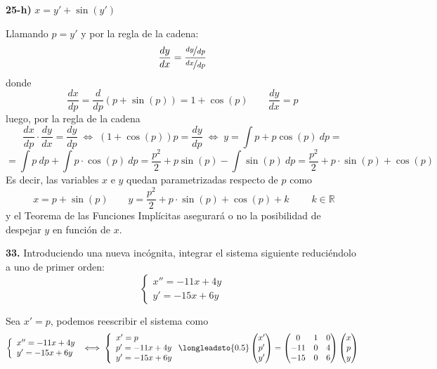 \begin{enumerate}
\textbf{25-h)} $x=y'+\sin(y')$
\begin{sol}
    Llamando $p=y'$ y por la regla de la cadena:
    $$\dfrac{dy}{dx}=\dfrac{\nicefrac{dy}{dp}}{\nicefrac{dx}{dp}}$$
    donde 
    $$\dfrac{dx}{dp}=\dfrac{d}{dp} (p + \sin (p))=1+\cos(p) \qquad \dfrac{dy}{dx}=p$$
    luego, por la regla de la cadena
    $$ \dfrac{dx}{dp} \cdot \dfrac{dy}{dx}=\dfrac{dy}{dp} \; \iff \; (1+\cos(p)) p = \dfrac{dy}{dp} \; \iff \; y=\int p + p \cos(p) \: dp=$$
    $$=\int p \:  dp + \int p \cdot \cos (p) \: dp = \dfrac{p^2}{2}+ p \sin (p) - \int \sin (p) \: dp=\dfrac{p^2}{2}+ p \cdot \sin (p) + \cos(p)$$
    Es decir, las variables $x$ e $y$ quedan parametrizadas respecto de $p$ como
    $$\boxed{ \; x=p+\sin(p) \qquad y=\dfrac{p^2}{2}+ p \cdot \sin (p) + \cos(p) + k \;} \qquad k \in \mathbb R$$
    y el Teorema de las Funciones Implícitas asegurará o no la posibilidad de despejar $y$ en función de $x$.
\end{sol}
\textbf{33.}  Introduciendo una nueva incógnita, integrar el sistema siguiente reduciéndolo a
uno de primer orden:
$$\left\{\begin{array}{l} x''=-11x+4y \\ y'=-15x+6y\end{array}\right.$$
\begin{sol}
    Sea $x'=p$, podemos reescribir el sistema como
    $$\left\{ \begin{array}{l}
         x'' = -11x + 4y  \\
         y' = -15x + 6y
    \end{array}\right. \iff \left\{ \begin{array}{l}
         x' = p \\
         p' = -11x+4y\\
         y' = -15x + 6y
    \end{array}\right. \longleadsto{0.5} \begin{pmatrix}
        x' \\ p' \\ y'
    \end{pmatrix}=\begin{pmatrix}
        0 & 1 & 0 \\
        -11 & 0 & 4 \\
        -15 & 0 & 6
    \end{pmatrix} \begin{pmatrix}
        x \\ p \\ y 
    \end{pmatrix}$$ 

\end{sol}
\end{enumerate}
